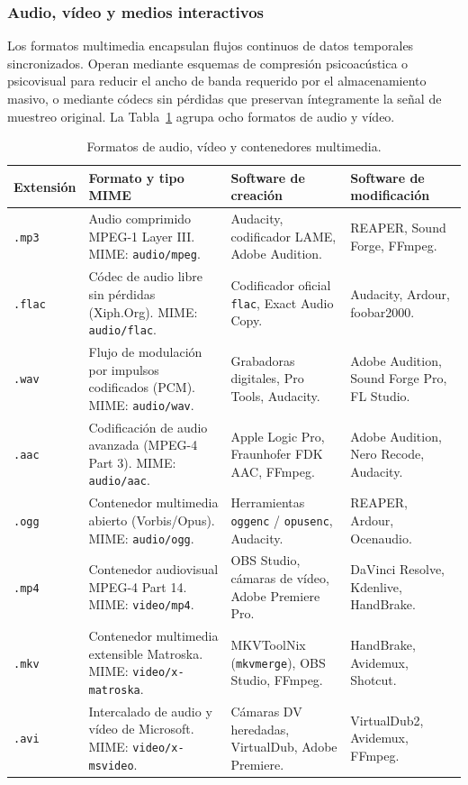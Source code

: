 \documentclass[12pt]{article}
\begin{document}
\subsubsection{Audio, vídeo y medios interactivos}
Los formatos multimedia encapsulan flujos continuos de datos temporales sincronizados. Operan mediante esquemas de compresión psicoacústica o psicovisual para reducir el ancho de banda requerido por el almacenamiento masivo, o mediante códecs sin pérdidas que preservan íntegramente la señal de muestreo original. La Tabla~\ref{tab:formatosMultimedia} agrupa ocho formatos de audio y vídeo.

\begin{table}[H]
\centering
\scriptsize
\renewcommand{\arraystretch}{0.95}
\renewcommand{\tabularxcolumn}[1]{m{#1}}
\setlength{\emergencystretch}{2em}
\caption{Formatos de audio, vídeo y contenedores multimedia.}
\label{tab:formatosMultimedia}
\begin{tabularx}{\textwidth}{>{\centering\arraybackslash}m{1.8cm} X X X}
\toprule
\textbf{Extensión} & \textbf{Formato y tipo MIME} & \textbf{Software de creación} & \textbf{Software de modificación} \\
\midrule
\texttt{.mp3} & Audio comprimido MPEG-1 Layer III. MIME: \texttt{audio/mpeg}. & Audacity, codificador LAME, Adobe Audition. & REAPER, Sound Forge, FFmpeg. \\
\texttt{.flac} & Códec de audio libre sin pérdidas (Xiph.Org). MIME: \texttt{audio/flac}. & Codificador oficial \texttt{flac}, Exact Audio Copy. & Audacity, Ardour, foobar2000. \\
\texttt{.wav} & Flujo de modulación por impulsos codificados (PCM). MIME: \texttt{audio/wav}. & Grabadoras digitales, Pro Tools, Audacity. & Adobe Audition, Sound Forge Pro, FL Studio. \\
\texttt{.aac} & Codificación de audio avanzada (MPEG-4 Part 3). MIME: \texttt{audio/aac}. & Apple Logic Pro, Fraunhofer FDK AAC, FFmpeg. & Adobe Audition, Nero Recode, Audacity. \\
\texttt{.ogg} & Contenedor multimedia abierto (Vorbis/Opus). MIME: \texttt{audio/ogg}. & Herramientas \texttt{oggenc} / \texttt{opusenc}, Audacity. & REAPER, Ardour, Ocenaudio. \\
\texttt{.mp4} & Contenedor audiovisual MPEG-4 Part 14. MIME: \texttt{video/mp4}. & OBS Studio, cámaras de vídeo, Adobe Premiere Pro. & DaVinci Resolve, Kdenlive, HandBrake. \\
\texttt{.mkv} & Contenedor multimedia extensible Matroska. MIME: \texttt{video/x-matroska}. & MKVToolNix (\texttt{mkvmerge}), OBS Studio, FFmpeg. & HandBrake, Avidemux, Shotcut. \\
\texttt{.avi} & Intercalado de audio y vídeo de Microsoft. MIME: \texttt{video/x-msvideo}. & Cámaras DV heredadas, VirtualDub, Adobe Premiere. & VirtualDub2, Avidemux, FFmpeg. \\
\bottomrule
\end{tabularx}
\end{table}
\end{document}

